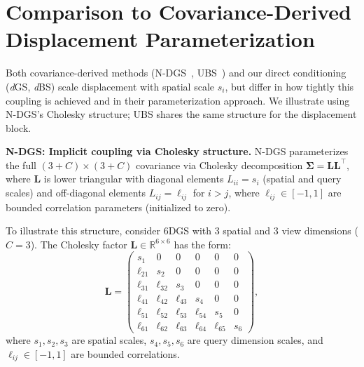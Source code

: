 \documentclass{article}
\newcommand{\dgs}{\textit{d}GS\xspace}
\newcommand{\dbs}{\textit{d}BS\xspace}
\theoremstyle{plain}
\theoremstyle{definition}
\theoremstyle{remark}
\begin{document}



\newpage
\appendix
\onecolumn
\section{Comparison to Covariance-Derived Displacement Parameterization}
\label{sec:spatial_scaling_proof}

Both covariance-derived methods (N-DGS~\cite{gao20246dgs,gao20257dgs}, UBS~\citep{liu2025universal}) and our direct conditioning (\dgs{}, \dbs{}) scale displacement with spatial scale $s_i$, but differ in how tightly this coupling is achieved and in their parameterization approach. We illustrate using N-DGS's Cholesky structure; UBS shares the same structure for the displacement block.

\textbf{N-DGS: Implicit coupling via Cholesky structure.} N-DGS parameterizes the full $(3+C) \times (3+C)$ covariance via Cholesky decomposition $\boldsymbol{\Sigma} = \mathbf{L}\mathbf{L}^\top$, where $\mathbf{L}$ is lower triangular with diagonal elements $L_{ii} = s_i$ (spatial and query scales) and off-diagonal elements $L_{ij} = \ell_{ij}$ for $i > j$, where $\ell_{ij} \in [-1,1]$ are bounded correlation parameters (initialized to zero).

To illustrate this structure, consider 6DGS with 3 spatial and 3 view dimensions ($C=3$). The Cholesky factor $\mathbf{L} \in \mathbb{R}^{6 \times 6}$ has the form:
\begin{equation}
\mathbf{L} = \left(\begin{array}{rrrrrr}
       s_1 &        0 &        0 &        0 &        0 &        0 \\
\ell_{21} &       s_2 &        0 &        0 &        0 &        0 \\
\ell_{31} & \ell_{32} &       s_3 &        0 &        0 &        0 \\
\ell_{41} & \ell_{42} & \ell_{43} &       s_4 &        0 &        0 \\
\ell_{51} & \ell_{52} & \ell_{53} & \ell_{54} &       s_5 &        0 \\
\ell_{61} & \ell_{62} & \ell_{63} & \ell_{64} & \ell_{65} &       s_6
\end{array}\right),
\end{equation}
where $s_1, s_2, s_3$ are spatial scales, $s_4, s_5, s_6$ are query dimension scales, and $\ell_{ij} \in [-1,1]$ are bounded correlations.
\end{document}
